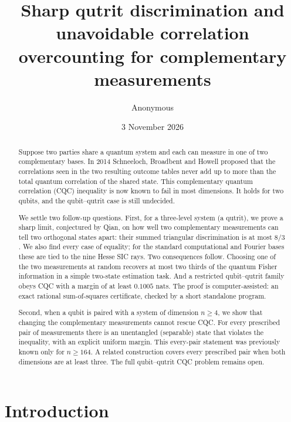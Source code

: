 \documentclass[11pt,a4paper]{article}
\title{Sharp qutrit discrimination and unavoidable correlation overcounting for complementary measurements}
\author{Anonymous}
\date{3 November 2026}
\numberwithin{equation}{section}
\theoremstyle{remark}\newtheorem{remark}[theorem]{Remark}
\begin{document}
\maketitle
\begin{abstract}
Suppose two parties share a quantum system and each can measure in one of two complementary bases. In 2014 Schneeloch, Broadbent and Howell proposed that the correlations seen in the two resulting outcome tables never add up to more than the total quantum correlation of the shared state. This complementary quantum correlation (CQC) inequality is now known to fail in most dimensions. It holds for two qubits, and the qubit--qutrit case is still undecided.

We settle two follow-up questions. First, for a three-level system (a qutrit), we prove a sharp limit, conjectured by Qian, on how well two complementary measurements can tell two orthogonal states apart: their summed triangular discrimination is at most $8/3$. We also find every case of equality; for the standard computational and Fourier bases these are tied to the nine Hesse SIC rays. Two consequences follow. Choosing one of the two measurements at random recovers at most two thirds of the quantum Fisher information in a simple two-state estimation task. And a restricted qubit--qutrit family obeys CQC with a margin of at least $0.1005$ nats. The proof is computer-assisted: an exact rational sum-of-squares certificate, checked by a short standalone program.

Second, when a qubit is paired with a system of dimension $n\ge4$, we show that changing the complementary measurements cannot rescue CQC. For every prescribed pair of measurements there is an unentangled (separable) state that violates the inequality, with an explicit uniform margin. This every-pair statement was previously known only for $n\ge164$. A related construction covers every prescribed pair when both dimensions are at least three. The full qubit--qutrit CQC problem remains open.
\end{abstract}

\section{Introduction}
\end{document}
